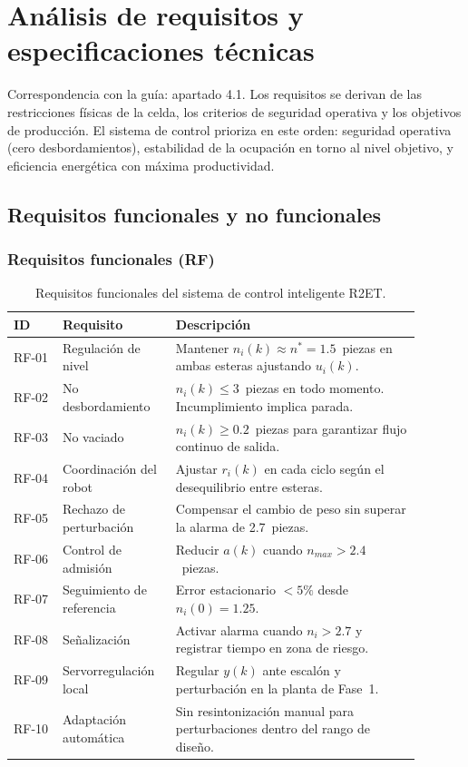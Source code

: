 \chapter[Requisitos y especificaciones]{Análisis de requisitos y especificaciones técnicas}
\label{ch:requisitos}

Correspondencia con la guía: apartado 4.1. Los requisitos se derivan de las restricciones físicas de la celda, los criterios de seguridad operativa y los objetivos de producción. El sistema de control prioriza en este orden: seguridad operativa (cero desbordamientos), estabilidad de la ocupación en torno al nivel objetivo, y eficiencia energética con máxima productividad.

\section{Requisitos funcionales y no funcionales}

\subsection*{Requisitos funcionales (RF)}

\begin{table}[H]
\centering
\small
\caption{Requisitos funcionales del sistema de control inteligente R2ET.}
\label{tab:req_func}
\begin{tabular}{@{}P{0.11\linewidth}P{0.23\linewidth}P{0.55\linewidth}@{}}
\toprule
ID & Requisito & Descripción \\ \midrule
RF-01 & Regulación de nivel & Mantener $n_i(k) \approx n^* = 1.5$~piezas en ambas esteras ajustando $u_i(k)$.\\
RF-02 & No desbordamiento & $n_i(k) \leq 3$~piezas en todo momento. Incumplimiento implica parada.\\
RF-03 & No vaciado & $n_i(k) \geq 0.2$~piezas para garantizar flujo continuo de salida.\\
RF-04 & Coordinación del robot & Ajustar $r_i(k)$ en cada ciclo según el desequilibrio entre esteras.\\
RF-05 & Rechazo de perturbación & Compensar el cambio de peso sin superar la alarma de 2.7~piezas.\\
RF-06 & Control de admisión & Reducir $a(k)$ cuando $n_{max} > 2.4$~piezas.\\
RF-07 & Seguimiento de referencia & Error estacionario $<5\%$ desde $n_i(0)=1.25$.\\
RF-08 & Señalización & Activar alarma cuando $n_i > 2.7$ y registrar tiempo en zona de riesgo.\\
RF-09 & Servorregulación local & Regular $y(k)$ ante escalón y perturbación en la planta de Fase~1.\\
RF-10 & Adaptación automática & Sin resintonización manual para perturbaciones dentro del rango de diseño.\\
\bottomrule
\end{tabular}
\end{table}

